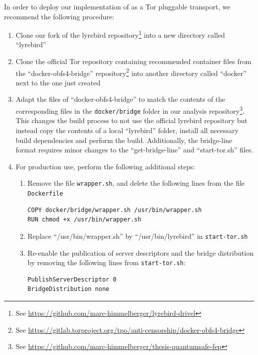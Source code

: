 In order to deploy our implementation of \drivel{} as a Tor pluggable transport, we recommend the following procedure:
\begin{enumerate}
    \item Clone our fork of the lyrebird repository\footnote{See \url{https://github.com/marc-himmelberger/lyrebird-drivel}} into a new directory called ``lyrebird''
    
    \item Clone the official Tor repository containing recommended container files from the ``docker-obfs4-bridge'' repository\footnote{See \url{https://gitlab.torproject.org/tpo/anti-censorship/docker-obfs4-bridge}} into another directory called ``docker'' next to the one just created
    
    \item Adapt the files of ``docker-obfs4-bridge'' to match the contents of the corresponding files in the \texttt{docker/bridge} folder in our analysis repository\footnote{See \url{https://github.com/marc-himmelberger/thesis-quantumsafe-fep}}. This changes the build process to not use the official lyrebird repository but instead copy the contents of a local ``lyrebird'' folder, install all necessary build dependencies and perform the build. Additionally, the bridge-line format requires minor changes to the ``get-bridge-line'' and ``start-tor.sh'' files.

    \item For production use, perform the following additional steps:
    \begin{enumerate}
        \item Remove the file \texttt{wrapper.sh}, and delete the following lines from the file \texttt{Dockerfile}
        \begin{lstlisting}
COPY docker/bridge/wrapper.sh /usr/bin/wrapper.sh
RUN chmod +x /usr/bin/wrapper.sh
        \end{lstlisting}

        \item Replace ``/usr/bin/wrapper.sh'' by ``/usr/bin/lyrebird'' in \texttt{start-tor.sh}

        \item Re-enable the publication of server descriptors and the bridge distribution by removing the following lines from \texttt{start-tor.sh}:
        \begin{lstlisting}
PublishServerDescriptor 0
BridgeDistribution none
        \end{lstlisting}
    \end{enumerate}
    \label{bul:prod-use-changes}


\end{enumerate}

